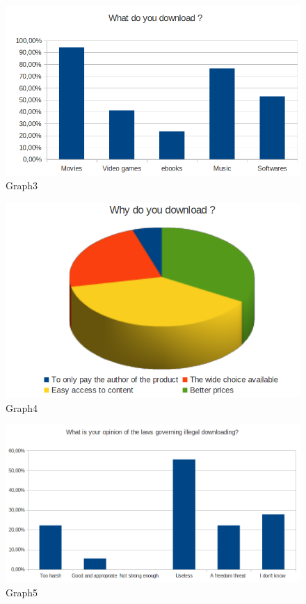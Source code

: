 \documentclass[a4paper]{article}
\begin{document}
\begin{figure}[htbp]
  \centering
  \includegraphics[scale=0.40]{graph3}
  \caption{Graph3}
  \label{fig:Graph3}
\end{figure}
\begin{figure}[htbp]
  \centering
  \includegraphics[scale=0.40]{graph4}
  \caption{Graph4}
  \label{fig:Graph4}
\end{figure}
\begin{figure}[htbp]
  \centering
  \includegraphics[scale=0.40]{graph5}
  \caption{Graph5}
  \label{fig:Graph5}
\end{figure}
\end{document}
